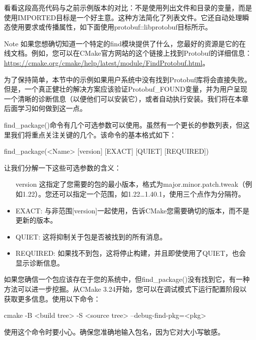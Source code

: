 看看这段高亮代码与之前示例版本的对比：不是使用列出文件和目录的变量，而是使用IMPORTED目标是一个好主意。这种方法简化了列表文件。它还自动处理瞬态使用要求或传播属性，如下面使用protobuf::libprotobuf目标所示。

\begin{myNotic}{Note}
如果您想确切知道一个特定的find模块提供了什么，您最好的资源是它的在线文档。例如，您可以在CMake官方网站的这个链接上找到Protobuf的详细信息：\url{https://cmake.org/cmake/help/latest/module/FindProtobuf.html}。
\end{myNotic}

为了保持简单，本节中的示例如果用户系统中没有找到Protobuf库将会直接失败。但是，一个真正健壮的解决方案应该验证Protobuf\_FOUND变量，并为用户呈现一个清晰的诊断信息（以便他们可以安装它），或者自动执行安装。我们将在本章后面学习如何做到这一点。

find\_package()命令有几个可选参数可以使用。虽然有一个更长的参数列表，但这里我们将重点关注关键的几个。该命令的基本格式如下：

\begin{shell}
find_package(<Name> [version] [EXACT] [QUIET] [REQUIRED])
\end{shell}

让我们分解一下这些可选参数的含义：

\begin{itemize}
\item
[version] 这指定了您需要的包的最小版本，格式为major.minor.patch.tweak（例如1.22）。您还可以指定一个范围，如1.22…1.40.1，使用三个点作为分隔符。

\item
EXACT: 与非范围[version]一起使用，告诉CMake您需要确切的版本，而不是更新的版本。

\item
QUIET: 这将抑制关于包是否被找到的所有消息。

\item
REQUIRED: 如果找不到包，这将停止构建，并且即使使用了QUIET，也会显示诊断信息。
\end{itemize}

如果您确信一个包应该存在于您的系统中，但find\_package()没有找到它，有一种方法可以进一步挖掘。从CMake 3.24开始，您可以在调试模式下运行配置阶段以获取更多信息。使用以下命令：

\begin{shell}
cmake -B <build tree> -S <source tree> --debug-find-pkg=<pkg>
\end{shell}

使用这个命令时要小心。确保您准确地输入包名，因为它对大小写敏感。

